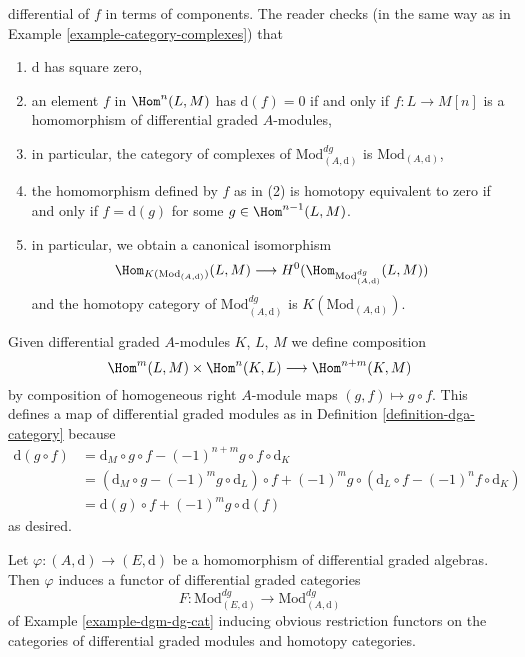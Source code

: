 \begin{example}
differential of $f$ in terms of components.
The reader checks (in the same way as in
Example \ref{example-category-complexes}) that
\begin{enumerate}
\item $\text{d}$ has square zero,
\item an element $f$ in $\Hom^n(L, M)$ has $\text{d}(f) = 0$ if and only if
$f : L \to M[n]$ is a homomorphism of differential graded $A$-modules,
\item in particular, the category of complexes of
$\text{Mod}^{dg}_{(A, \text{d})}$ is $\text{Mod}_{(A, \text{d})}$,
\item the homomorphism defined by $f$ as in (2) is homotopy equivalent
to zero if and only if $f = \text{d}(g)$ for some
$g \in \Hom^{n - 1}(L, M)$.
\item in particular, we obtain a canonical isomorphism
$$
\Hom_{K(\text{Mod}_{(A, \text{d})})}(L, M)
\longrightarrow
H^0(\Hom_{\text{Mod}^{dg}_{(A, \text{d})}}(L, M))
$$
and the homotopy category of $\text{Mod}^{dg}_{(A, \text{d})}$ is
$K(\text{Mod}_{(A, \text{d})})$.
\end{enumerate}
Given differential graded $A$-modules $K$, $L$, $M$ we define
composition
$$
\Hom^m(L, M) \times \Hom^n(K, L) \longrightarrow \Hom^{n + m}(K, M)
$$
by composition of homogeneous right $A$-module maps $(g, f) \mapsto g \circ f$.
This defines a map of differential graded modules as in
Definition \ref{definition-dga-category}
because
\begin{align*}
\text{d}(g \circ f) & =
\text{d}_M \circ g \circ f - (-1)^{n + m} g \circ f \circ \text{d}_K \\
& =
\left(\text{d}_M \circ g - (-1)^m g \circ \text{d}_L\right) \circ f +
(-1)^m g \circ \left(\text{d}_L \circ f - (-1)^n f \circ \text{d}_K\right) \\
& =
\text{d}(g) \circ f + (-1)^m g \circ \text{d}(f)
\end{align*}
as desired.
\end{example}

\begin{lemma}
\label{lemma-homomorphism-induces-dga-functor}
Let $\varphi : (A, \text{d}) \to (E, \text{d})$ be a homomorphism of
differential graded algebras. Then $\varphi$ induces a functor of differential
graded categories
$$
F :
\text{Mod}^{dg}_{(E, \text{d})}
\longrightarrow
\text{Mod}^{dg}_{(A, \text{d})}
$$
of Example \ref{example-dgm-dg-cat} inducing obvious restriction functors
on the categories of differential graded modules and homotopy categories.
\end{lemma}

